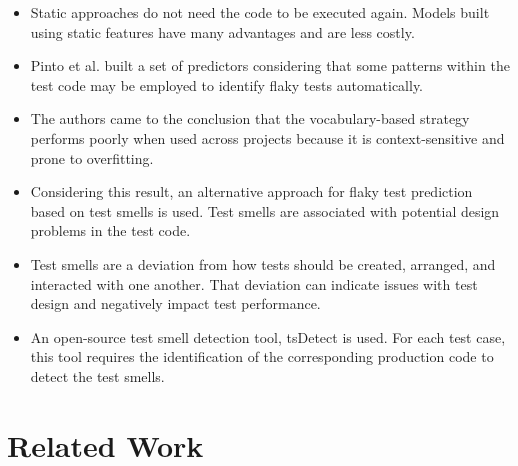 \documentclass[sigconf,review]{acmart}
\begin{document}
\begin{itemize}
    \item Static approaches do not need the code to be executed again. Models built using static features have many advantages and are less costly.
    \item Pinto et al. \cite{r5}built a set of predictors considering that some patterns within the test code may be employed to identify flaky tests automatically.
    \item The authors came to the conclusion that the vocabulary-based strategy performs poorly when used across projects because it is context-sensitive and prone to overfitting.
    \item Considering this result, an alternative approach for flaky test prediction based on test smells is used. Test smells are associated with potential design problems in the test code.
    \item Test smells are a deviation from how tests should be created, arranged, and interacted with one another. That deviation can indicate issues with test design and negatively impact test performance.
    \item An open-source test smell detection tool, tsDetect is used. For each test case, this tool requires the identification of the corresponding production code to detect the test smells.
\end{itemize}



 \section{Related Work}
 \label{Section:RelatedWork}
\end{document}
